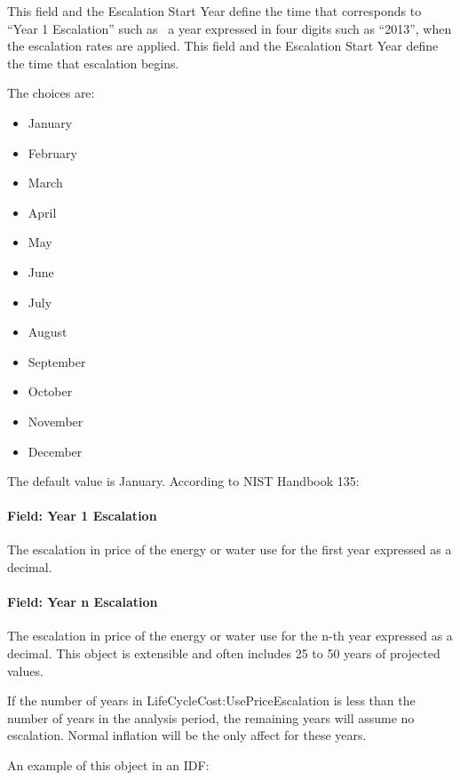 This field and the Escalation Start Year define the time that corresponds to ``Year 1 Escalation'' such as~ a year expressed in four digits such as ``2013'', when the escalation rates are applied. This field and the Escalation Start Year define the time that escalation begins.

The choices are:

\begin{itemize}
\item
  January
\item
  February
\item
  March
\item
  April
\item
  May
\item
  June
\item
  July
\item
  August
\item
  September
\item
  October
\item
  November
\item
  December
\end{itemize}

The default value is January. According to NIST Handbook 135:

\paragraph{Field: Year 1 Escalation}\label{field-year-1-escalation}

The escalation in price of the energy or water use for the first year expressed as a decimal.

\paragraph{Field: Year n Escalation}\label{field-year-n-escalation}

The escalation in price of the energy or water use for the n-th year expressed as a decimal. This object is extensible and often includes 25 to 50 years of projected values.

If the number of years in LifeCycleCost:UsePriceEscalation is less than the number of years in the analysis period, the remaining years will assume no escalation. Normal inflation will be the only affect for these years.

An example of this object in an IDF:

